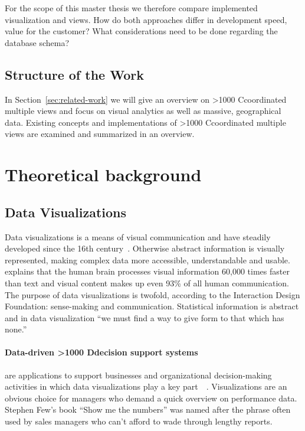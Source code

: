 \documentclass{article}
\newcommand\hmm[1]{\ifnum\ifhmode\spacefactor\else2000\fi>1000 \uppercase{#1}\else#1\fi}
\newcommand{\cmvs}{\hmm{c}oordinated multiple views}
\newcommand{\dss}{\hmm{d}ecision support systems}
\begin{document}
For the scope of this master thesis we therefore compare implemented visualization and views.
How do both approaches differ in development speed, value for the customer?
What considerations need to be done regarding the database schema?

\subsection{Structure of the Work}

In Section~\ref{sec:related-work} we will give an overview on \cmvs{} and focus on visual analytics as well as massive, geographical data.
Existing concepts and implementations of \cmvs{} are examined and summarized in an overview.

\clearpage
\section{Theoretical background}\label{sec:theory}

\subsection{Data Visualizations}
Data visualizations is a means of visual communication and have steadily developed since the 16th century~\cite{Friendly2001}.
Otherwise abstract information is visually represented, making complex data more accessible, understandable and usable.
\textcite{Kusinitz2014} explains that the human brain processes visual information 60,000 times faster than text and visual content makes up even 93\% of all human communication.
The purpose of data visualizations is twofold, according to the Interaction Design Foundation: sense-making and communication.
Statistical information is abstract and in data visualization ``we must find a way to give form to that which has none.''\cite{Few2013}

\paragraph{Data-driven \dss{}} are applications to support businesses and organizational decision-making activities in which data visualizations play a key part~\cite{Nada2007}~\cite{Poleto2015}.
Visualizations are an obvious choice for managers who demand a quick overview on performance data.
Stephen Few's book ``Show me the numbers'' was named after the phrase often used by sales managers who can't afford to wade through lengthy reports.
\end{document}
